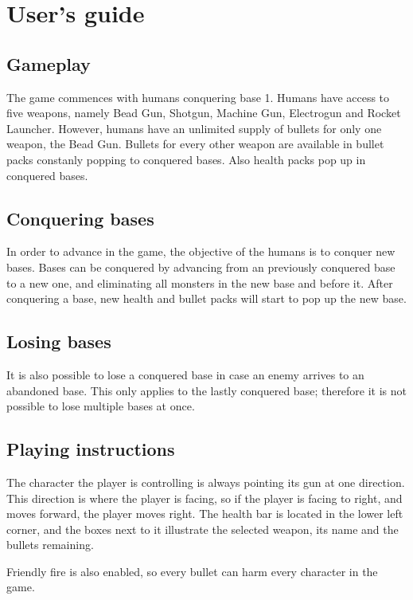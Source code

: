 \documentclass[a4paper,12pt,titlepage]{article}
\begin{document}
\section{User's guide}

\subsection{Gameplay}
The game commences with humans conquering base 1. Humans have access to five weapons, namely Bead Gun, Shotgun, Machine Gun, Electrogun and Rocket Launcher. However, humans have an unlimited supply of bullets for only one weapon, the Bead Gun. Bullets for every other weapon are available in bullet packs constanly popping to conquered bases. Also health packs pop up in conquered bases.

\subsection{Conquering bases}
In order to advance in the game, the objective of the humans is to conquer new bases. Bases can be conquered by advancing from an previously conquered base to a new one, and eliminating all monsters in the new base and before it. After conquering a base, new health and bullet packs will start to pop up the new base.

\subsection{Losing bases}
It is also possible to lose a conquered base in case an enemy arrives to an abandoned base. This only applies to the lastly conquered base; therefore it is not possible to lose multiple bases at once.

\subsection{Playing instructions}
The character the player is controlling is always pointing its gun at one direction. This direction is where the player is facing, so if the player is facing to right, and moves forward, the player moves right. The health bar is located in the lower left corner, and the boxes next to it illustrate the selected weapon, its name and the bullets remaining.

Friendly fire is also enabled, so every bullet can harm every character in the game.
\end{document}
